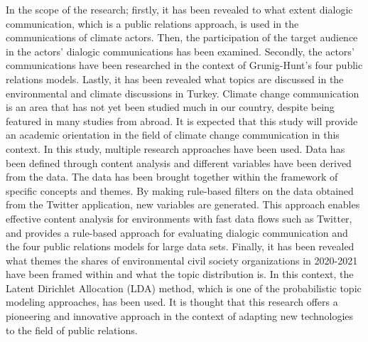 \documentclass[
]{book}
\begin{document}
In the scope of the research; firstly, it has been revealed to what extent dialogic communication, which is a public relations approach, is used in the communications of climate actors. Then, the participation of the target audience in the actors' dialogic communications has been examined. Secondly, the actors' communications have been researched in the context of Grunig-Hunt's four public relations models. Lastly, it has been revealed what topics are discussed in the environmental and climate discussions in Turkey. Climate change communication is an area that has not yet been studied much in our country, despite being featured in many studies from abroad. It is expected that this study will provide an academic orientation in the field of climate change communication in this context.
In this study, multiple research approaches have been used. Data has been defined through content analysis and different variables have been derived from the data. The data has been brought together within the framework of specific concepts and themes. By making rule-based filters on the data obtained from the Twitter application, new variables are generated. This approach enables effective content analysis for environments with fast data flows such as Twitter, and provides a rule-based approach for evaluating dialogic communication and the four public relations models for large data sets. Finally, it has been revealed what themes the shares of environmental civil society organizations in 2020-2021 have been framed within and what the topic distribution is. In this context, the Latent Dirichlet Allocation (LDA) method, which is one of the probabilistic topic modeling approaches, has been used. It is thought that this research offers a pioneering and innovative approach in the context of adapting new technologies to the field of public relations.
\end{document}
